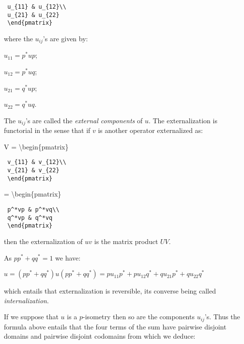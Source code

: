 \texttt{~u\_\{11\}~\&~u\_\{12\}\textbackslash{}\textbackslash{}}\\
\texttt{~u\_\{21\}~\&~u\_\{22\}}\\
\texttt{~\textbackslash{}end\{pmatrix\}}

where the \(u_{ij}\)'s are given by:

\begin{description}
\tightlist
\item[]
\(u_{11} = p^*up\);

\(u_{12} = p^*uq\);

\(u_{21} = q^*up\);

\(u_{22} = q^*uq\).
\end{description}

The \(u_{ij}\)'s are called the \emph{external components} of \(u\). The
externalization is functorial in the sense that if \(v\) is another
operator externalized as:

\begin{description}
\tightlist
\item[]
V = \textbackslash{}begin\{pmatrix\}
\end{description}

\texttt{~v\_\{11\}~\&~v\_\{12\}\textbackslash{}\textbackslash{}}\\
\texttt{~v\_\{21\}~\&~v\_\{22\}}\\
\texttt{~\textbackslash{}end\{pmatrix\}~}

= \textbackslash{}begin\{pmatrix\}

\texttt{~p\^{}*vp~\&~p\^{}*vq\textbackslash{}\textbackslash{}}\\
\texttt{~q\^{}*vp~\&~q\^{}*vq}\\
\texttt{~\textbackslash{}end\{pmatrix\}}

 then the externalization of \(uv\) is the matrix product \(UV\).

As \(pp^* + qq^* = 1\) we have:

\begin{description}
\tightlist
\item[]
\(u = (pp^*+qq^*)u(pp^*+qq^*) = pu_{11}p^* + pu_{12}q^* + qu_{21}p^* + qu_{22}q^*\)
\end{description}

which entails that externalization is reversible, its converse being
called \emph{internalization}.

If we suppose that \(u\) is a \(p\)-isometry then so are the components
\(u_{ij}\)'s. Thus the formula above entails that the four terms of the
sum have pairwise disjoint domains and pairwise disjoint codomains from
which we deduce:

